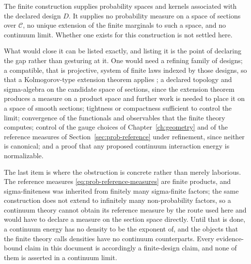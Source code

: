 \medskip
{}
The finite construction supplies probability spaces and kernels associated with the declared design $D$. It supplies no probability measure on a space of sections over $\mathcal C$, no unique extension of the finite marginals to such a space, and no continuum limit. Whether one exists for this construction is not settled here. 
\medskip

What would close it can be listed exactly, and listing it is the point of declaring the gap rather than gesturing at it. One would need a refining family of designs; a compatible, that is projective, system of finite laws indexed by those designs, so that a Kolmogorov-type extension theorem applies \citep{Kallenberg2021}; a declared topology and sigma-algebra on the candidate space of sections, since the extension theorem produces a measure on a product space and further work is needed to place it on a space of smooth sections; tightness or compactness sufficient to control the limit; convergence of the functionals and observables that the finite theory computes; control of the gauge choices of Chapter~\ref{ch:geometry} and of the reference measures of Section~\ref{sec:prob-reference} under refinement, since neither is canonical; and a proof that any proposed continuum interaction energy is normalizable.

The last item is where the obstruction is concrete rather than merely laborious. The reference measures \eqref{eq:prob-reference-measures} are finite products, and sigma-finiteness was inherited from finitely many sigma-finite factors; the same construction does not extend to infinitely many non-probability factors, so a continuum theory cannot obtain its reference measure by the route used here and would have to declare a measure on the section space directly. Until that is done, a continuum energy has no density to be the exponent of, and the objects that the finite theory calls densities have no continuum counterparts. Every evidence-bound claim in this document is accordingly a finite-design claim, and none of them is asserted in a continuum limit.
